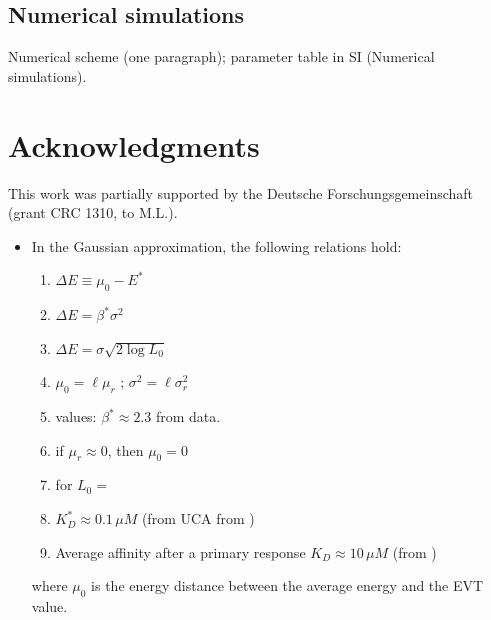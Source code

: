 \documentclass[aps, pre, twocolumn, 10pt, groupedaddress, superscriptaddress, linenumbers]{revtex4-2}
\newcommand{\DG}{E}
\newcommand{\todo}[1]{{\noindent \color{red} #1}}
\begin{document}
\subsection*{Numerical simulations}
\todo{Numerical scheme (one paragraph); parameter table in SI (Numerical simulations).}


\section*{Acknowledgments}
This work was partially supported by the Deutsche Forschungsgemeinschaft (grant CRC 1310, to M.L.).



  

\todo{
\begin{itemize}
	\item In the Gaussian approximation, the following relations hold:
	\begin{enumerate}
		\item $\Delta \DG \equiv \mu_0 - \DG^*$
		\item $\Delta \DG = \beta^*\sigma^2$
		\item $\Delta \DG = \sigma\sqrt{2\log L_0}$
		\item $\mu_0 =  \ell \mu_r$ ; $\sigma^2 = \ell \sigma_r^2$
		\item values: $\beta^*\approx 2.3$ from data.
		\item if $\mu_r \approx 0$, then $\mu_0=0$
		\item for $L_0 = $
		\item $K_D^* \approx 0.1\,\mu M$ (from UCA from \cite{Mesin_2020_Restricted_clonality})
		\item Average affinity after a primary response $K_D \approx 10 \,\mu M$ (from \cite{Eisen_2014_AM, AltanBonnet_2020_Review}) 
	\end{enumerate}
	where $\mu_0$ is the energy distance between the average energy and the EVT value. 
\end{itemize}
}
\end{document}

